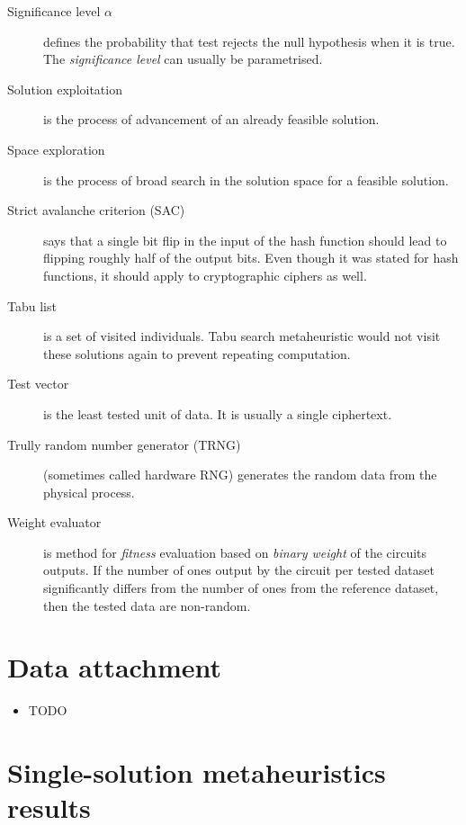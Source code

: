 \documentclass[
    digital,    %
    oneside,    %
    color,
    11pt,
    nocover,
    notable,
    nolof,
    nolot,
]{fithesis3}
\begin{document}
\begin{description}
    \item[Significance level $\alpha$] defines the probability that test rejects the null hypothesis when it is true. The \textit{significance level} can usually be parametrised.
    \item[Solution exploitation] is the process of advancement of an already feasible solution.
    \item[Space exploration] is the process of broad search in the solution space for a feasible solution.
    \item[Strict avalanche criterion (SAC)] says that a single bit flip in the input of the hash function should lead to flipping roughly half of the output bits. Even though it was stated for hash functions, it should apply to cryptographic ciphers as well.
    \item[Tabu list] is a set of visited individuals. Tabu search metaheuristic would not visit these solutions again to prevent repeating computation.
    \item[Test vector] is the least tested unit of data. It is usually a single ciphertext.
    \item[Trully random number generator (TRNG)] (sometimes called hardware RNG) generates the random data from the physical process.
    \item[Weight evaluator] is method for \textit{fitness} evaluation based on \textit{binary weight} of the circuits outputs. If the number of ones output by the circuit per tested dataset significantly differs from the number of ones from the reference dataset, then the tested data are non-random.
\end{description}

\chapter{Data attachment}
\label{chap:app-data}

\begin{itemize}
    \item TODO
\end{itemize}

\chapter{Single-solution metaheuristics results}
\label{chap:app-ss-res}
\end{document}
